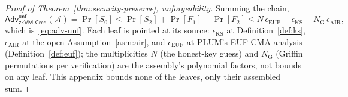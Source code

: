 \begin{proof}[Proof of Theorem~\ref{thm:security-preserve}, unforgeability]
    \smallskip\noindent Summing the chain,
    \[
      \mathsf{Adv}^{\mathsf{unf}}_{\mathsf{zkVM\text{-}Cred}}(\mathcal A)=\Pr[S_0]
      \le \Pr[S_2]+\Pr[F_1]+\Pr[F_2]
      \le N\,\epsilon_{\mathrm{EUF}}+\epsilon_{\mathrm{KS}}
         +N_{\mathrm G}\,\epsilon_{\mathrm{AIR}},
    \]
which is~\eqref{eq:adv-unf}. Each leaf is pointed at its source: $\epsilon_{\mathrm{KS}}$ at Definition~\ref{def:ks}, $\epsilon_{\mathrm{AIR}}$ at the open Assumption~\ref{asm:air}, and $\epsilon_{\mathrm{EUF}}$ at PLUM's EUF-CMA analysis (Definition~\ref{def:euf}); the multiplicities $N$ (the honest-key guess) and $N_{\mathrm G}$ (Griffin permutations per verification) are the assembly's polynomial factors, not bounds on any leaf. This appendix bounds none of the leaves, only their assembled sum.
\end{proof}

